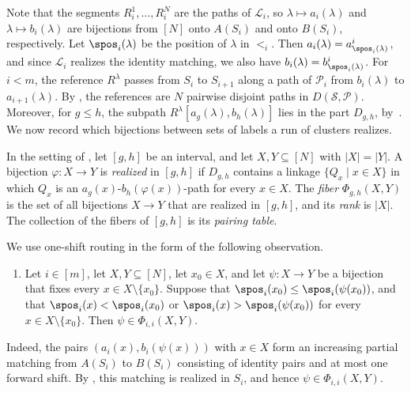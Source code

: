 \documentclass[fontsize=12pt,leading=14pt]{fullpaper}
\newcommand{\Lcal}{\mathcal{L}}
\newcommand{\Pcal}{\mathcal{P}}
\newcommand{\Scal}{\mathcal{S}}
\begin{document}
Note that the segments $R^1_i,\dots,R^N_i$ are the paths of $\Lcal_i$, so $\lambda\mapsto a_i(\lambda)$ and $\lambda\mapsto b_i(\lambda)$ are bijections from $[N]$ onto $A(S_i)$ and onto $B(S_i)$, respectively.
Let $\spos_i(\lambda)$ be the position of $\lambda$ in $<_i$.
Then $a_i(\lambda)=a^i_{\spos_i(\lambda)}$, and since $\Lcal_i$ realizes the identity matching, we also have $b_i(\lambda)=b^i_{\spos_i(\lambda)}$.
For $i<m$, the reference $R^\lambda$ passes from $S_i$ to $S_{i+1}$ along a path of $\Pcal_i$ from $b_i(\lambda)$ to $a_{i+1}(\lambda)$.
By , the references are $N$ pairwise disjoint paths in $D(\Scal,\Pcal)$.
Moreover, for $g\le h$, the subpath $R^\lambda[a_g(\lambda),b_h(\lambda)]$ lies in the part $D_{g,h}$, by~.
We now record which bijections between sets of labels a run of clusters realizes.

\begin{definition}\label{def:s3-pairing-table}
  In the setting of , let $[g,h]$ be an interval, and let $X,Y\subseteq[N]$ with $|X|=|Y|$.
  A bijection $\varphi\colon X\to Y$ is \emph{realized} in $[g,h]$ if $D_{g,h}$ contains a linkage $\{Q_x\mid x\in X\}$ in which $Q_x$ is an $a_g(x)$-$b_h(\varphi(x))$-path for every $x\in X$.
  The \emph{fiber} $\Phi_{g,h}(X,Y)$ is the set of all bijections $X\to Y$ that are realized in $[g,h]$, and its \emph{rank} is $|X|$.
  The collection of the fibers of $[g,h]$ is its \emph{pairing table}.
\end{definition}

We use one-shift routing in the form of the following observation.
\begin{enumerate}[label=\textnormal{(OS)}]
  \item\label{item:s3-OS} Let $i\in[m]$, let $X,Y\subseteq[N]$, let $x_0\in X$, and let $\psi\colon X\to Y$ be a bijection that fixes every $x\in X\setminus\{x_0\}$.
    Suppose that $\spos_i(x_0)\le\spos_i(\psi(x_0))$, and that $\spos_i(x)<\spos_i(x_0)$ or $\spos_i(x)>\spos_i(\psi(x_0))$ for every $x\in X\setminus\{x_0\}$.
    Then $\psi\in\Phi_{i,i}(X,Y)$.
\end{enumerate}
Indeed, the pairs $(a_i(x),b_i(\psi(x)))$ with $x\in X$ form an increasing partial matching from $A(S_i)$ to $B(S_i)$ consisting of identity pairs and at most one forward shift.
By , this matching is realized in $S_i$, and hence $\psi\in\Phi_{i,i}(X,Y)$.
\end{document}
